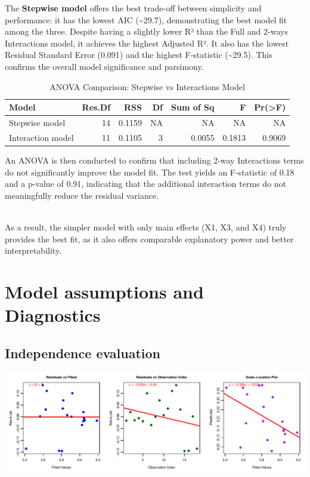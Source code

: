 \documentclass[
  11pt,
]{article}
\begin{document}
The \textbf{Stepwise model} offers the best trade-off between simplicity
and performance: it has the lowest AIC (\textasciitilde29.7),
demonstrating the best model fit among the three. Despite having a
slightly lower R² than the Full and 2-ways Interactions model, it
achieves the highest Adjusted R². It also has the lowest Residual
Standard Error (0.091) and the highest F-statistic
(\textasciitilde29.5). This confirms the overall model significance and
parsimony.

\begin{table}[!h]
\centering
\caption{\label{tab:unnamed-chunk-18}ANOVA Comparison: Stepwise vs Interactions Model}
\centering
\fontsize{8}{10}\selectfont
\begin{tabular}[t]{lrrrrrr}
\toprule
Model & Res.Df & RSS & Df & Sum of Sq & F & Pr(>F)\\
\midrule
Stepwise model & 14 & 0.1159 & NA & NA & NA & NA\\
Interaction model & 11 & 0.1105 & 3 & 0.0055 & 0.1813 & 0.9069\\
\bottomrule
\end{tabular}
\end{table}

An ANOVA is then conducted to confirm that including 2-way Interactions
terms do not significantly improve the model fit. The test yields an
F-statistic of 0.18 and a p-value of 0.91, indicating that the
additional interaction terms do not meaningfully reduce the residual
variance.\\
\strut \\
As a result, the simpler model with only main effects (X1, X3, and X4)
truly provides the best fit, as it also offers comparable explanatory
power and better interpretability.

\section{Model assumptions and
Diagnostics}\label{model-assumptions-and-diagnostics}

\subsection{Independence evaluation}\label{independence-evaluation}

\includegraphics{Figs/unnamed-chunk-19-1.pdf}
\end{document}
